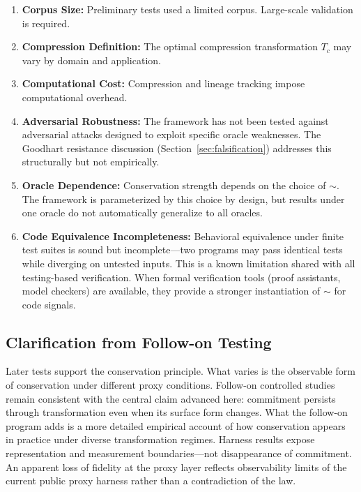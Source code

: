 \documentclass[11pt,a4paper]{article}
\begin{document}
\begin{enumerate}
    \item \textbf{Corpus Size:} Preliminary tests used a limited corpus. Large-scale validation is required.

    \item \textbf{Compression Definition:} The optimal compression transformation $T_c$ may vary by domain and application.

    \item \textbf{Computational Cost:} Compression and lineage tracking impose computational overhead.

    \item \textbf{Adversarial Robustness:} The framework has not been tested against adversarial attacks designed to exploit specific oracle weaknesses. The Goodhart resistance discussion (Section~\ref{sec:falsification}) addresses this structurally but not empirically.

    \item \textbf{Oracle Dependence:} Conservation strength depends on the choice of $\sim$. The framework is parameterized by this choice by design, but results under one oracle do not automatically generalize to all oracles.

    \item \textbf{Code Equivalence Incompleteness:} Behavioral equivalence under finite test suites is sound but incomplete---two programs may pass identical tests while diverging on untested inputs. This is a known limitation shared with all testing-based verification. When formal verification tools (proof assistants, model checkers) are available, they provide a stronger instantiation of $\sim$ for code signals.
\end{enumerate}

\subsection{Clarification from Follow-on Testing}
\label{sec:followon-clarification}

Later tests support the conservation principle. What varies is the observable form of conservation under different proxy conditions. Follow-on controlled studies remain consistent with the central claim advanced here: commitment persists through transformation even when its surface form changes. What the follow-on program adds is a more detailed empirical account of how conservation appears in practice under diverse transformation regimes. Harness results expose representation and measurement boundaries---not disappearance of commitment. An apparent loss of fidelity at the proxy layer reflects observability limits of the current public proxy harness rather than a contradiction of the law.
\end{document}
